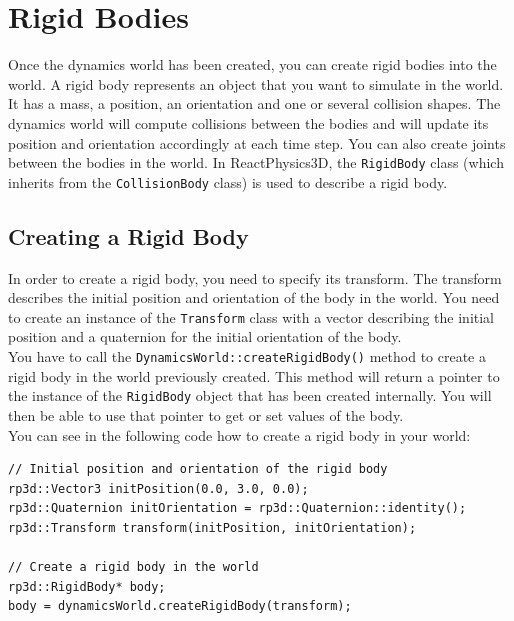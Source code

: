 \documentclass[a4paper,12pt]{article}
\begin{document}
    \section{Rigid Bodies}
    \label{sec:rigidbody}

    Once the dynamics world has been created, you can create rigid bodies into the world. A rigid body represents an object that you want to simulate in the world.
    It has a mass, a position, an orientation and one or several collision shapes. The dynamics world will compute collisions between the bodies and will update its position
    and orientation accordingly at each time step. You can also create joints between the bodies in the world. In ReactPhysics3D, the \texttt{RigidBody} class
    (which inherits from the \texttt{CollisionBody} class) is used to describe a rigid body.

    \subsection{Creating a Rigid Body}

    In order to create a rigid body, you need to specify its transform. The transform describes the initial
    position and orientation of the body in the world. You need to create an instance of the \texttt{Transform} class with a vector describing the
    initial position and a quaternion for the initial orientation of the body. \\

    You have to call the \texttt{DynamicsWorld::createRigidBody()} method to create a rigid body in the world previously created. This method will return a pointer to the
    instance of the \texttt{RigidBody} object that has been created internally. You will then be able to use that pointer to get or set values of the body. \\

    You can see in the following code how to create a rigid body in your world: \\

    \begin{lstlisting}
// Initial position and orientation of the rigid body
rp3d::Vector3 initPosition(0.0, 3.0, 0.0);
rp3d::Quaternion initOrientation = rp3d::Quaternion::identity();
rp3d::Transform transform(initPosition, initOrientation);

// Create a rigid body in the world
rp3d::RigidBody* body;
body = dynamicsWorld.createRigidBody(transform);
    \end{lstlisting}
\end{document}

